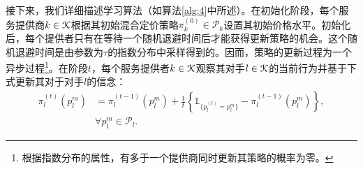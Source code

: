接下来，我们详细描述学习算法（如算法\ref{alg:4}中所述）。在初始化阶段，每个服务提供商$k\in\mathcal{K}$根据其初始混合定价策略$\pi_k^{(0)}\in\mathcal{P}_k$设置其初始价格水平。初始化后，每个提供者只有在等待一个随机退避时间后才能获得更新策略的机会。这个随机退避时间是由参数为$\tau$的指数分布中采样得到的。因而，策略的更新过程为一个异步过程\footnote{根据指数分布的属性，有多于一个提供商同时更新其策略的概率为零。}。在阶段$t$，每个服务提供者$k\in\mathcal{K}$观察其对手$l\in\mathcal{K}$的当前行为并基于下式更新其对于对手$l$的信念：
\begin{align}\label{eq:belief}
\pi_l^{(t)}(p_l^m)&=\pi_l^{(t-1)}(p_l^m)+\frac{1}{t}\left\{\mathds{1}_{\{p_l^{(t)}=p_l^m\}}-\pi_l^{(t-1)}(p_l^m)\right\},\nonumber\\
&\forall p^m_l\in\mathcal{P}_l.
\end{align}

